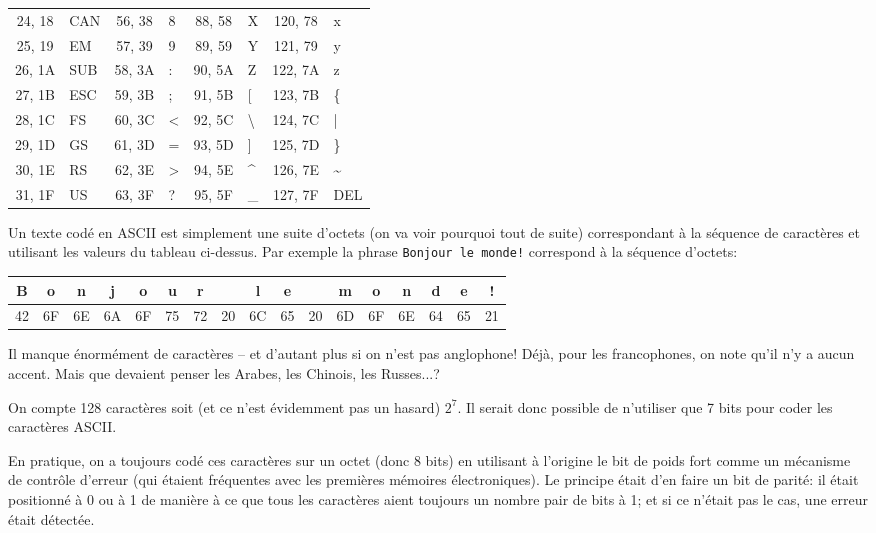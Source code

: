 \documentclass[12pt]{article}
\begin{document}
\begin{center}
\begin{tabular}{|c|l||c|l||c|l||c|l|}
			24, 18 & CAN & 56, 38 & 8 & 88, 58 & X & 120, 78 & x \\
			25, 19 & EM & 57, 39 & 9 & 89, 59 & Y & 121, 79 & y \\
			26, 1A & SUB & 58, 3A & : & 90, 5A & Z & 122, 7A & z \\
			27, 1B & ESC & 59, 3B & ; & 91, 5B & [ & 123, 7B & \{ \\
			28, 1C & FS & 60, 3C & < & 92, 5C & \textbackslash & 124, 7C & | \\
			29, 1D & GS & 61, 3D & = & 93, 5D & ] & 125, 7D & \} \\
			30, 1E & RS & 62, 3E & > & 94, 5E & \textasciicircum & 126, 7E & \textasciitilde \\
			31, 1F & US & 63, 3F & ? & 95, 5F & \_ & 127, 7F & DEL \\
			\hline
		\end{tabular}
	\end{center}
	
	Un texte codé en ASCII est  simplement une suite d'octets (on va voir pourquoi tout de suite) correspondant à la séquence de caractères et utilisant les valeurs du tableau ci-dessus. Par exemple la phrase \texttt{Bonjour le monde!} correspond à la séquence d'octets:
	
	\ttfamily
	\begin{center}
		\begin{tabular}{|c|c|c|c|c|c|c|c|c|c|c|c|c|c|c|c|c|}
			\hline
			B&o&n&j&o&u&r& &l&e& &m&o&n&d&e&! \\
			\hline
			42&6F&6E&6A&6F&75&72&20&6C&65&20&6D&6F&6E&64&65&21 \\
			\hline
		\end{tabular}
	\end{center}
	
	\normalfont
	\begin{MaReponse}
		Il manque énormément de caractères -- et d'autant plus si on n'est pas anglophone! Déjà, pour les francophones, on note qu'il n'y a aucun accent. Mais que devaient penser les Arabes, les Chinois, les Russes...?
	\end{MaReponse}
	
	\begin{MaReponse}
		On compte 128 caractères soit (et ce n'est évidemment pas un hasard) $2^7$. Il serait donc possible de n'utiliser que 7 bits pour coder les caractères ASCII.
		
		En pratique, on a toujours codé ces caractères sur un octet (donc 8 bits) en utilisant à l'origine le bit de poids fort comme un mécanisme de contrôle d'erreur (qui étaient fréquentes avec les premières mémoires électroniques). Le principe était d'en faire un bit de parité: il était positionné à 0 ou à 1 de manière à ce que tous les caractères aient toujours un nombre pair de bits à 1; et si ce n'était pas le cas, une erreur était détectée.
	\end{MaReponse}
	
\end{document}
